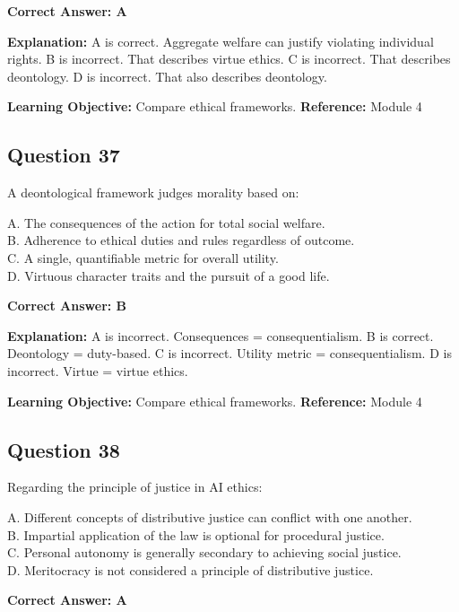 \documentclass[11pt]{article}
\begin{document}
	\vspace{0.4em}
	\textbf{Correct Answer: A}
	
	\textbf{Explanation:}
	A is correct. Aggregate welfare can justify violating individual rights.
	B is incorrect. That describes virtue ethics.
	C is incorrect. That describes deontology.
	D is incorrect. That also describes deontology.
	
	\textbf{Learning Objective:} Compare ethical frameworks.
	\textbf{Reference:} Module 4
	
	\subsection*{Question 37}
	A deontological framework judges morality based on:
	
	A. The consequences of the action for total social welfare.\\
	B. Adherence to ethical duties and rules regardless of outcome.\\
	C. A single, quantifiable metric for overall utility.\\
	D. Virtuous character traits and the pursuit of a good life.
	
	\vspace{0.4em}
	\textbf{Correct Answer: B}
	
	\textbf{Explanation:}
	A is incorrect. Consequences = consequentialism.
	B is correct. Deontology = duty-based.
	C is incorrect. Utility metric = consequentialism.
	D is incorrect. Virtue = virtue ethics.
	
	\textbf{Learning Objective:} Compare ethical frameworks.
	\textbf{Reference:} Module 4
	
	\subsection*{Question 38}
	Regarding the principle of justice in AI ethics:
	
	A. Different concepts of distributive justice can conflict with one another.\\
	B. Impartial application of the law is optional for procedural justice.\\
	C. Personal autonomy is generally secondary to achieving social justice.\\
	D. Meritocracy is not considered a principle of distributive justice.
	
	\vspace{0.4em}
	\textbf{Correct Answer: A}
	
\end{document}
